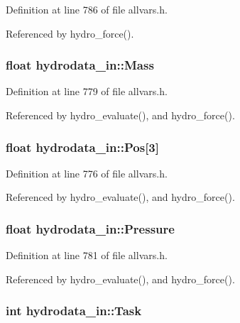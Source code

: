 Definition at line 786 of file allvars.h.



Referenced by hydro\_\-force().

\hypertarget{structhydrodata__in_a5fb05f5111cc5541a5f2d9ad647b0665}{
\subsubsection[{Mass}]{\setlength{\rightskip}{0pt plus 5cm}float {\bf hydrodata\_\-in::Mass}}}
\label{structhydrodata__in_a5fb05f5111cc5541a5f2d9ad647b0665}


Definition at line 779 of file allvars.h.



Referenced by hydro\_\-evaluate(), and hydro\_\-force().

\hypertarget{structhydrodata__in_af50edb8226de4bdcdbcc0f2679cc694d}{
\subsubsection[{Pos}]{\setlength{\rightskip}{0pt plus 5cm}float {\bf hydrodata\_\-in::Pos}\mbox{[}3\mbox{]}}}
\label{structhydrodata__in_af50edb8226de4bdcdbcc0f2679cc694d}


Definition at line 776 of file allvars.h.



Referenced by hydro\_\-evaluate(), and hydro\_\-force().

\hypertarget{structhydrodata__in_a95298759ae954d623a92d59f71d318ba}{
\subsubsection[{Pressure}]{\setlength{\rightskip}{0pt plus 5cm}float {\bf hydrodata\_\-in::Pressure}}}
\label{structhydrodata__in_a95298759ae954d623a92d59f71d318ba}


Definition at line 781 of file allvars.h.



Referenced by hydro\_\-evaluate(), and hydro\_\-force().

\hypertarget{structhydrodata__in_a7d38ae5b3289a90c4d33add0572942cc}{
\subsubsection[{Task}]{\setlength{\rightskip}{0pt plus 5cm}int {\bf hydrodata\_\-in::Task}}}
\label{structhydrodata__in_a7d38ae5b3289a90c4d33add0572942cc}


